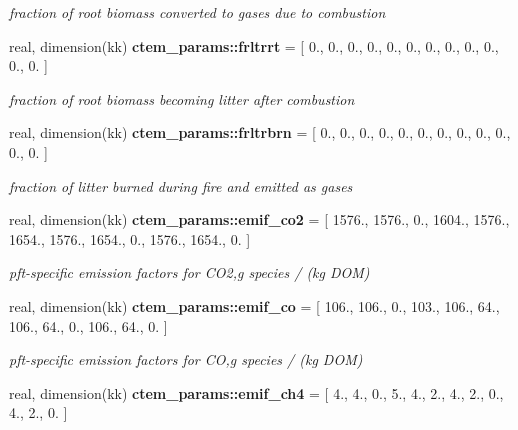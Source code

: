 \begin{DoxyCompactItemize}
\begin{DoxyCompactList}\small\item\em fraction of root biomass converted to gases due to combustion \end{DoxyCompactList}\item 
\hypertarget{namespacectem__params_a6081b9662214fa2aa63c3080fc1868ae}{}real, dimension(kk) {\bfseries ctem\+\_\+params\+::frltrrt} = \mbox{[} 0., 0., 0., 0., 0., 0., 0., 0., 0., 0., 0., 0. \mbox{]}\label{namespacectem__params_a6081b9662214fa2aa63c3080fc1868ae}

\begin{DoxyCompactList}\small\item\em fraction of root biomass becoming litter after combustion \end{DoxyCompactList}\item 
\hypertarget{namespacectem__params_a7f36ae05e8efb516582037530650eac9}{}real, dimension(kk) {\bfseries ctem\+\_\+params\+::frltrbrn} = \mbox{[} 0., 0., 0., 0., 0., 0., 0., 0., 0., 0., 0., 0. \mbox{]}\label{namespacectem__params_a7f36ae05e8efb516582037530650eac9}

\begin{DoxyCompactList}\small\item\em fraction of litter burned during fire and emitted as gases \end{DoxyCompactList}\item 
\hypertarget{namespacectem__params_a07af3ba9ecabbbac0d884937d56e1b7a}{}real, dimension(kk) {\bfseries ctem\+\_\+params\+::emif\+\_\+co2} = \mbox{[} 1576., 1576., 0., 1604., 1576., 1654., 1576., 1654., 0., 1576., 1654., 0. \mbox{]}\label{namespacectem__params_a07af3ba9ecabbbac0d884937d56e1b7a}

\begin{DoxyCompactList}\small\item\em pft-\/specific emission factors for C\+O2,g species / (kg D\+O\+M) \end{DoxyCompactList}\item 
\hypertarget{namespacectem__params_ad22701db48fc392e6905ec845347eb82}{}real, dimension(kk) {\bfseries ctem\+\_\+params\+::emif\+\_\+co} = \mbox{[} 106., 106., 0., 103., 106., 64., 106., 64., 0., 106., 64., 0. \mbox{]}\label{namespacectem__params_ad22701db48fc392e6905ec845347eb82}

\begin{DoxyCompactList}\small\item\em pft-\/specific emission factors for C\+O,g species / (kg D\+O\+M) \end{DoxyCompactList}\item 
\hypertarget{namespacectem__params_aa4e0d098146e23e88141b2d5804b6dfe}{}real, dimension(kk) {\bfseries ctem\+\_\+params\+::emif\+\_\+ch4} = \mbox{[} 4., 4., 0., 5., 4., 2., 4., 2., 0., 4., 2., 0. \mbox{]}\label{namespacectem__params_aa4e0d098146e23e88141b2d5804b6dfe}


\end{DoxyCompactItemize}
